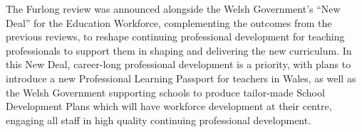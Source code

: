 \documentclass[conference]{IEEEtran}
\begin{document}

The Furlong review was announced alongside the Welsh Government's ``New
Deal'' for the Education Workforce, complementing the outcomes from the
previous reviews, to reshape continuing professional development for
teaching professionals to support them in shaping and delivering the
new curriculum. In this New Deal, career-long professional development
is a priority, with plans to introduce a new Professional Learning
Passport for teachers in Wales, as well as the Welsh Government
supporting schools to produce tailor-made School Development Plans
which will have workforce development at their centre, engaging all
staff in high quality continuing professional development.

\end{document}
